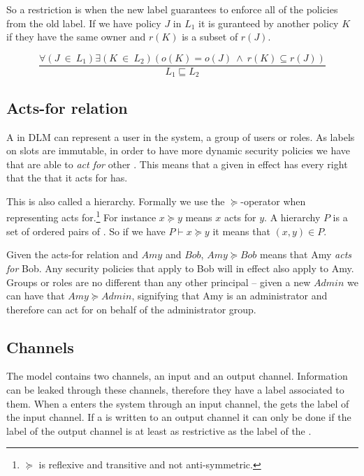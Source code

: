 \begin{definition}
  So a restriction is when the new label guarantees to enforce all of the policies from the old label.
  If we have policy $J$ in $L_1$ it is guranteed by another policy $K$ if they have the same owner and $r(K)$ is a subset of $r(J)$.
  \begin{center}
    \[\frac{\forall (J \ \in \ L_1) \exists (K \ \in \ L_2)(o(K) = o(J) \ \wedge \ r(K) \subseteq r(J))}{L_1 \sqsubseteq L_2}\]    
  \end{center}
\end{definition}

\subsection{Acts-for relation}
A \principal{} in DLM can represent a user in the system, a group of users or roles.
As labels on slots are immutable, in order to have more dynamic security policies we have that \principals{} are able to \textit{act for} other \principals{}.
This means that a given \principal{} in effect has every right that the \principal{} that it acts for has.

This is also called a \principal{} hierarchy.
Formally we use the $\succeq$-operator when representing acts for.\footnote{$\succeq$ is reflexive and transitive and not anti-symmetric.}
For instance $x \succeq y$ means $x$ acts for $y$.
A \principal{} hierarchy $P$ is a set of ordered pairs of \principals{}.
So if we have $P \vdash x \succeq y$ it means that $(x,y) \in P$.

Given the acts-for relation and \principals{} $Amy$ and $Bob$, $Amy \succeq Bob$ means that Amy \textit{acts for} Bob.
Any security policies that apply to Bob will in effect also apply to Amy.
Groups or roles are no different than any other principal -- given a new \principal{} $Admin$ we can have that $Amy \succeq Admin$, signifying that Amy is an administrator and therefore can act for on behalf of the administrator group.
\subsection{Channels}
The model contains two channels, an input and an output channel.
Information can be leaked through these channels, therefore they have a label associated to them.
When a \xvalue{} enters the system through an input channel, the \xvalue{} gets the label of the input channel.
If a \xvalue{} is written to an output channel it can only be done if the label of the output channel is at least as restrictive as the label of the \xvalue{}.
